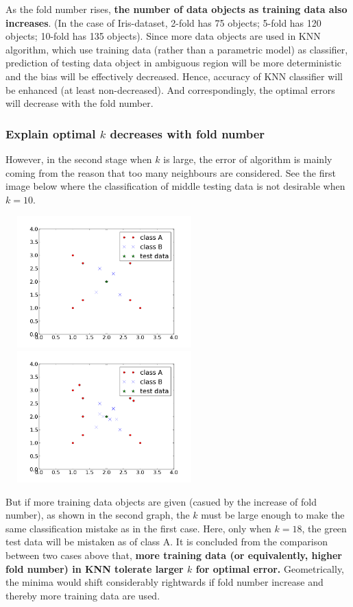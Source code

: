 \documentclass[11pt,a4paper]{article}
\newcommand{\htab}{\hspace*{0.63cm}}
\begin{document}
\htab As the fold number rises, \textbf{the number of data objects as training data also increases}. (In the case of Iris-dataset, 2-fold has 75 objects; 5-fold has 120 objects; 10-fold has 135 objects). Since more data objects are used in KNN algorithm, which use training data (rather than a parametric model) as classifier, prediction of testing data object in ambiguous region will be more deterministic and the bias will be effectively decreased. Hence, accuracy of KNN classifier will be enhanced (at least non-decreased). And correspondingly, the optimal errors will decrease with the fold number.
\subsubsection{Explain optimal $k$ decreases with fold number}
\htab However, in the second stage when $k$ is large, the error of algorithm is mainly coming from the reason that too many neighbours are considered. See the first image below where the classification of middle testing data is not desirable when $k=10$. 
\begin{center}
\includegraphics[width=3in,height=2in]{./picture/F4.png}
\includegraphics[width=3in,height=2in]{./picture/F5.png}\\
\end{center}
\htab But if more training data objects are given (casued by the increase of fold number), as shown in the second graph, the $k$ must be large enough to make the same classification mistake as in the first case. Here, only when $k=18$, the green test data will be mistaken as of class A. It is concluded from the comparison between two cases above that, \textbf{more training data (or equivalently, higher fold number) in KNN tolerate larger $k$ for optimal error.} Geometrically, the minima would shift considerably rightwards if fold number increase and thereby more training data are used.
\newpage
\end{document}
